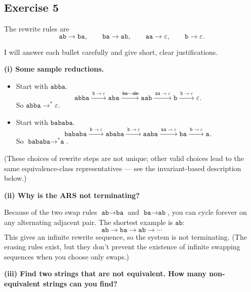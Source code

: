 \documentclass[12pt]{article}
\begin{document}
\subsection*{Exercise 5}

The rewrite rules are
\[
\texttt{ab}\longrightarrow\texttt{ba},\qquad
\texttt{ba}\longrightarrow\texttt{ab},\qquad
\texttt{aa}\longrightarrow\varepsilon,\qquad
\texttt{b}\longrightarrow\varepsilon.
\]

I will answer each bullet carefully and give short, clear justifications.

\medskip

\textbf{(i) Some sample reductions.}

\begin{itemize}
  \item Start with \(\texttt{abba}\).
  \[
    \texttt{abba}\xrightarrow{\ \texttt{b}\to\varepsilon\ } \texttt{aba}
    \xrightarrow{\ \texttt{ba}\to\texttt{ab}\ } \texttt{aab}
    \xrightarrow{\ \texttt{aa}\to\varepsilon\ } \texttt{b}
    \xrightarrow{\ \texttt{b}\to\varepsilon\ }\varepsilon.
  \]
  So \(\texttt{abba}\to^{*}\varepsilon\).
  \item Start with \(\texttt{bababa}\).
  \[
    \texttt{bababa}\xrightarrow{\ \texttt{b}\to\varepsilon\ } \texttt{ababa}
    \xrightarrow{\ \texttt{b}\to\varepsilon\ } \texttt{aaba}
    \xrightarrow{\ \texttt{aa}\to\varepsilon\ } \texttt{ba}
    \xrightarrow{\ \texttt{b}\to\varepsilon\ } \texttt{a}.
  \]
  So \(\texttt{bababa}\to^{*}\texttt{a}\).
\end{itemize}

(These choices of rewrite steps are not unique; other valid choices lead to the same equivalence-class representatives — see the invariant-based description below.)

\bigskip

\textbf{(ii) Why is the ARS not terminating?}

Because of the two swap rules \(\texttt{ab}\to\texttt{ba}\) and \(\texttt{ba}\to\texttt{ab}\), you can cycle forever on any alternating adjacent pair. The shortest example is \(\texttt{ab}\):
\[
\texttt{ab}\longrightarrow\texttt{ba}\longrightarrow\texttt{ab}\longrightarrow\cdots
\]
This gives an infinite rewrite sequence, so the system is not terminating. (The erasing rules exist, but they don't prevent the existence of infinite swapping sequences when you choose only swaps.)

\bigskip

\textbf{(iii) Find two strings that are not equivalent. How many non-equivalent strings can you find?}
\end{document}
